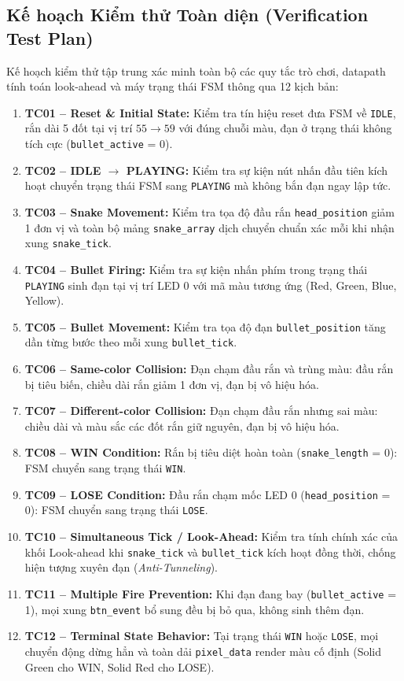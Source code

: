 \documentclass[12pt,a4paper]{article}
\begin{document}
\subsection{Kế hoạch Kiểm thử Toàn diện (Verification Test Plan)}
Kế hoạch kiểm thử tập trung xác minh toàn bộ các quy tắc trò chơi, datapath tính toán look-ahead và máy trạng thái FSM thông qua 12 kịch bản:
\begin{enumerate}
    \item \textbf{TC01 -- Reset \& Initial State:} Kiểm tra tín hiệu reset đưa FSM về \texttt{IDLE}, rắn dài 5 đốt tại vị trí $55\rightarrow 59$ với đúng chuỗi màu, đạn ở trạng thái không tích cực (\texttt{bullet\_active} = 0).
    \item \textbf{TC02 -- IDLE $\rightarrow$ PLAYING:} Kiểm tra sự kiện nút nhấn đầu tiên kích hoạt chuyển trạng thái FSM sang \texttt{PLAYING} mà không bắn đạn ngay lập tức.
    \item \textbf{TC03 -- Snake Movement:} Kiểm tra tọa độ đầu rắn \texttt{head\_position} giảm 1 đơn vị và toàn bộ mảng \texttt{snake\_array} dịch chuyển chuẩn xác mỗi khi nhận xung \texttt{snake\_tick}.
    \item \textbf{TC04 -- Bullet Firing:} Kiểm tra sự kiện nhấn phím trong trạng thái \texttt{PLAYING} sinh đạn tại vị trí LED 0 với mã màu tương ứng (Red, Green, Blue, Yellow).
    \item \textbf{TC05 -- Bullet Movement:} Kiểm tra tọa độ đạn \texttt{bullet\_position} tăng dần từng bước theo mỗi xung \texttt{bullet\_tick}.
    \item \textbf{TC06 -- Same-color Collision:} Đạn chạm đầu rắn và trùng màu: đầu rắn bị tiêu biến, chiều dài rắn giảm 1 đơn vị, đạn bị vô hiệu hóa.
    \item \textbf{TC07 -- Different-color Collision:} Đạn chạm đầu rắn nhưng sai màu: chiều dài và màu sắc các đốt rắn giữ nguyên, đạn bị vô hiệu hóa.
    \item \textbf{TC08 -- WIN Condition:} Rắn bị tiêu diệt hoàn toàn (\texttt{snake\_length} = 0): FSM chuyển sang trạng thái \texttt{WIN}.
    \item \textbf{TC09 -- LOSE Condition:} Đầu rắn chạm mốc LED 0 (\texttt{head\_position} = 0): FSM chuyển sang trạng thái \texttt{LOSE}.
    \item \textbf{TC10 -- Simultaneous Tick / Look-Ahead:} Kiểm tra tính chính xác của khối Look-ahead khi \texttt{snake\_tick} và \texttt{bullet\_tick} kích hoạt đồng thời, chống hiện tượng xuyên đạn (\textit{Anti-Tunneling}).
    \item \textbf{TC11 -- Multiple Fire Prevention:} Khi đạn đang bay (\texttt{bullet\_active} = 1), mọi xung \texttt{btn\_event} bổ sung đều bị bỏ qua, không sinh thêm đạn.
    \item \textbf{TC12 -- Terminal State Behavior:} Tại trạng thái \texttt{WIN} hoặc \texttt{LOSE}, mọi chuyển động dừng hẳn và toàn dải \texttt{pixel\_data} render màu cố định (Solid Green cho WIN, Solid Red cho LOSE).
\end{enumerate}
\end{document}

